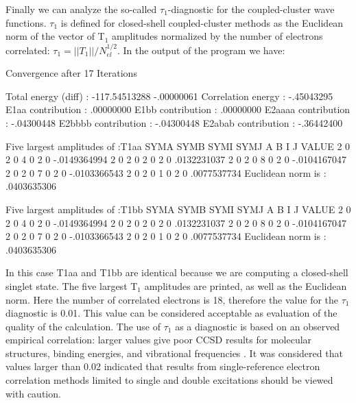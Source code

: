 
Finally we can analyze the so-called $\tau_1$-diagnostic \cite{Lee:89}
for the coupled-cluster wave functions. $\tau_1$ is defined for closed-shell
coupled-cluster methods as the Euclidean norm of the vector of T$_1$
amplitudes normalized by the number of electrons correlated:
$\tau_1 = ||T_1||/N_{el}^{1/2}$.
In the output of the  program we have:

\begin{sourcelisting}
      Convergence after  17  Iterations


      Total energy (diff) :    -117.54513288       -.00000061
      Correlation energy  :       -.45043295
      E1aa   contribution :        .00000000
      E1bb   contribution :        .00000000
      E2aaaa contribution :       -.04300448
      E2bbbb contribution :       -.04300448
      E2abab contribution :       -.36442400


 Five largest amplitudes of :T1aa
  SYMA   SYMB   SYMI   SYMJ     A      B      I      J     VALUE
    2      0      2      0      4      0      2      0     -.0149364994
    2      0      2      0      2      0      2      0      .0132231037
    2      0      2      0      8      0      2      0     -.0104167047
    2      0      2      0      7      0      2      0     -.0103366543
    2      0      2      0      1      0      2      0      .0077537734
 Euclidean norm is :      .0403635306

 Five largest amplitudes of :T1bb
  SYMA   SYMB   SYMI   SYMJ     A      B      I      J     VALUE
    2      0      2      0      4      0      2      0     -.0149364994
    2      0      2      0      2      0      2      0      .0132231037
    2      0      2      0      8      0      2      0     -.0104167047
    2      0      2      0      7      0      2      0     -.0103366543
    2      0      2      0      1      0      2      0      .0077537734
 Euclidean norm is :      .0403635306
\end{sourcelisting}

In this case T1aa and T1bb are identical because we are computing a
closed-shell singlet state. The five largest T$_1$ amplitudes are
printed, as well as the Euclidean norm. Here the number of correlated
electrons is 18, therefore the value for the $\tau_1$ diagnostic is 0.01.
This value can be considered acceptable as evaluation of the
quality of the calculation. The use of $\tau_1$ as a diagnostic is
based on an observed empirical correlation: larger values give poor
CCSD results for molecular structures, binding energies, and
vibrational frequencies \cite{Lee:92}. It was considered that values
larger than 0.02 indicated that results from single-reference electron
correlation methods limited to single and double excitations should be
viewed with caution. 

